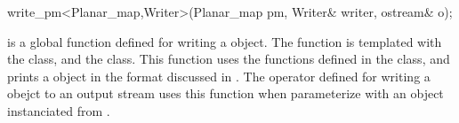 
\ccRefPageBegin


\begin{ccRefFunction}{write_pm<Planar_map,Writer>(Planar_map pm, Writer& writer, ostream& o);}


\ccDefinition
{} is a global function defined for writing a  object. 
The function is templated with the  class, and the  class.  
This function uses the functions defined in the  class, and prints a  
 object in the format discussed in . 
The operator defined for writing a  obejct to an output stream 
uses this function when parameterize  with an object instanciated from .


\end{ccRefFunction} %

\ccRefPageEnd











